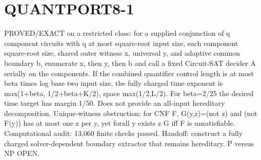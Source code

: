 \documentclass{article}
\begin{document}
\section*{QUANTPORT8-1}
PROVED/EXACT on a restricted class: for a supplied conjunction of q component circuits with q at most square-root input size, each component square-root size, shared outer witness x, universal y, and adaptive common boundary b, enumerate x, then y, then b and call a fixed Circuit-SAT decider A serially on the components. If the combined quantifier control length is at most beta times log base two input size, the fully charged time exponent is max(1+beta, 1/2+beta+K/2), space max(1/2,L/2). For beta=2/25 the desired time target has margin 1/50. Does not provide an all-input hereditary decomposition. Unique-witness obstruction: for CNF F, G(y,z)=(not z) and (not F(y)) has at most one z per y, yet forall y exists z G iff F is unsatisfiable. Computational audit: 13,060 finite checks passed. Handoff: construct a fully charged solver-dependent boundary extractor that remains hereditary. P versus NP OPEN.
\end{document}
